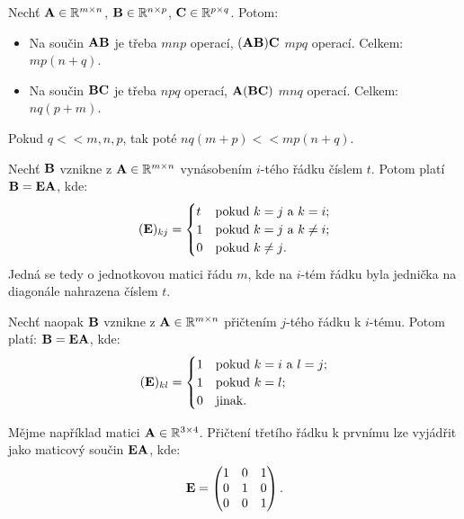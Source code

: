 \begin{remark}
    Nechť $\mathbf{A} \in \mathbb{R}^{m \times n}$, $\mathbf{B} \in \mathbb{R}^{n \times p}$, $\mathbf{C} \in \mathbb{R}^{p \times q}$.
    Potom:
    \begin{itemize}
        \item Na součin $\mathbf{A}\mathbf{B}$ je třeba $mnp$ operací,
            $(\mathbf{A}\mathbf{B})\mathbf{C}$ $mpq$ operací. Celkem: $mp(n+q)$.
        \item Na součin $\mathbf{B}\mathbf{C}$ je třeba $npq$ operací,
            $\mathbf{A}(\mathbf{B}\mathbf{C})$ $mnq$ operací. Celkem: $nq(p+m)$.
    \end{itemize}
    Pokud $q << m,n,p$, tak poté $nq(m+p) << mp(n+q)$.
\end{remark}

\begin{remark}
    \label{remark:elementop}
    Nechť $\mathbf{B}$ vznikne z $\mathbf{A} \in \mathbb{R}^{m \times n}$ vynásobením $i$-tého řádku
    číslem $t$. Potom platí $\mathbf{B} = \mathbf{E}\mathbf{A}$, kde:
    \begin{equation*}
        (\mathbf{E})_{kj} = \begin{cases}
            t &\text{pokud $k = j$ a $k = i$;} \\
            1 &\text{pokud $k = j$ a $k \neq i$;} \\
            0 &\text{pokud $k \neq j$.}
        \end{cases}
    \end{equation*}
    Jedná se tedy o jednotkovou matici řádu $m$, kde na $i$-tém řádku
    byla jednička na diagonále nahrazena číslem $t$.

    Nechť naopak $\mathbf{B}$ vznikne z $\mathbf{A} \in \mathbb{R}^{m \times n}$ přičtením $j$-tého
    řádku k $i$-tému. Potom platí: $\mathbf{B} = \mathbf{E}\mathbf{A}$, kde:
    \begin{equation*}
        (\mathbf{E})_{kl} = \begin{cases}
            1 &\text{pokud $k = i$ a $l = j$;} \\
            1 &\text{pokud $k = l$;} \\
            0 &\text{jinak.}
        \end{cases}
    \end{equation*}

    Mějme například matici $\mathbf{A} \in \mathbb{R}^{3 \times 4}$. Přičtení třetího řádku k
            prvnímu lze vyjádřit jako maticový součin 
            $\mathbf{E}\mathbf{A}$, kde:
            $$ \mathbf{E} = \begin{pmatrix}
                1 &0 &1 \\
                0 &1 &0 \\
                0 &0 &1
            \end{pmatrix}.$$
\end{remark}

